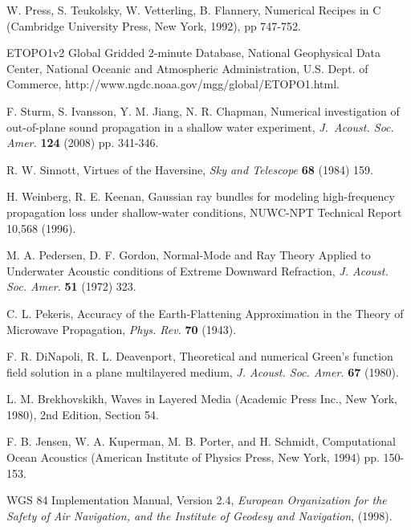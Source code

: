 \documentclass{ws-jca}
\begin{document}
\begin{thebibliography}{0}
 W. Press, S. Teukolsky, W. Vetterling, B. Flannery,
Numerical Recipes in C (Cambridge University Press, New York, 1992), pp
747-752.

 ETOPO1v2 Global Gridded 2-minute Database, National
Geophysical Data Center, National Oceanic and Atmospheric Administration,
U.S. Dept. of Commerce, http://www.ngdc.noaa.gov/mgg/global/ETOPO1.html.

 F. Sturm, S. Ivansson, Y. M. Jiang, N. R. Chapman,
Numerical investigation of out-of-plane sound propagation in a shallow
water experiment, {\it J.~Acoust. Soc. Amer.} {\bf 124} (2008) pp. 341-346.

 R. W. Sinnott, Virtues of the Haversine, {\it Sky and
Telescope} {\bf 68} (1984) 159.

 H. Weinberg, R. E. Keenan, Gaussian ray bundles for
modeling high-frequency propagation loss under shallow-water conditions, 
NUWC-NPT Technical Report 10,568 (1996).

 M. A. Pedersen, D. F. Gordon, Normal-Mode and Ray
Theory Applied to Underwater Acoustic conditions of Extreme Downward
Refraction, {\it J. Acoust. Soc. Amer.} {\bf 51} (1972) 323.

 C. L. Pekeris, Accuracy of the Earth-Flattening Approximation in the Theory of Microwave Propagation, {\it Phys. Rev.} {\bf 70} (1943).

 F. R. DiNapoli, R. L. Deavenport, Theoretical and
numerical Green's function field solution in a plane multilayered medium,
{\it J. Acoust. Soc. Amer.} {\bf 67} (1980).

 L. M. Brekhovskikh, Waves in Layered Media
(Academic Press Inc., New York, 1980), 2nd Edition, Section 54.

 F. B. Jensen, W. A. Kuperman, M. B. Porter, and H.
Schmidt, Computational Ocean Acoustics (American Institute of Physics
Press, New York, 1994) pp. 150-153.

 WGS 84 Implementation Manual, Version 2.4, {\it European
Organization for the Safety of Air Navigation, and the Institute of Geodesy
and Navigation}, (1998).

\end{thebibliography}
\end{document}
